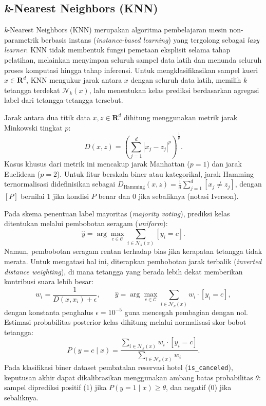 \subsection{\textit{k}-Nearest Neighbors (KNN)}

\textit{k}-Nearest Neighbors (KNN) merupakan algoritma pembelajaran mesin non-parametrik
berbasis instans (\textit{instance-based learning}) yang tergolong sebagai \textit{lazy learner}.
KNN tidak membentuk fungsi pemetaan eksplisit selama tahap pelatihan, melainkan menyimpan
seluruh sampel data latih dan menunda seluruh proses komputasi hingga tahap inferensi.
Untuk mengklasifikasikan sampel kueri $x \in \mathbf{R}^d$, KNN mengukur jarak antara $x$
dengan seluruh data latih, memilih $k$ tetangga terdekat $\mathcal{N}_k(x)$, lalu
menentukan kelas prediksi berdasarkan agregasi label dari tetangga-tetangga tersebut.

Jarak antara dua titik data $x, z \in \mathbf{R}^d$ dihitung menggunakan metrik jarak
Minkowski tingkat $p$:
\[
D(x, z) = \left( \sum_{j=1}^d |x_j - z_j|^p \right)^{\frac{1}{p}} .
\]
Kasus khusus dari metrik ini mencakup jarak Manhattan ($p=1$) dan jarak Euclidean ($p=2$).
Untuk fitur berskala biner atau kategorikal, jarak Hamming ternormalisasi didefinisikan sebagai
$D_{\text{Hamming}}(x, z) = \frac{1}{d} \sum_{j=1}^d [x_j \neq z_j]$, dengan $[P]$ bernilai 1 jika kondisi $P$ benar dan 0 jika sebaliknya (notasi Iverson).

Pada skema penentuan label mayoritas (\textit{majority voting}), prediksi kelas ditentukan
melalui pembobotan seragam (\textit{uniform}):
\[
\hat{y} = \arg\max_{c \in \mathcal{C}} \sum_{i \in \mathcal{N}_k(x)} [y_i = c] .
\]
Namun, pembobotan seragam rentan terhadap bias jika kerapatan tetangga tidak merata.
Untuk mengatasi hal ini, diterapkan pembobotan jarak terbalik (\textit{inverted distance weighting}),
di mana tetangga yang berada lebih dekat memberikan kontribusi suara lebih besar:
\[
w_i = \frac{1}{D(x, x_i) + \epsilon}, \qquad
\hat{y} = \arg\max_{c \in \mathcal{C}} \sum_{i \in \mathcal{N}_k(x)} w_i \cdot [y_i = c] ,
\]
dengan konstanta penghalus $\epsilon = 10^{-5}$ guna mencegah pembagian dengan nol.
Estimasi probabilitas posterior kelas dihitung melalui normalisasi skor bobot tetangga:
\[
P(y = c \mid x) = \frac{\sum_{i \in \mathcal{N}_k(x)} w_i \cdot [y_i = c]}{\sum_{i \in \mathcal{N}_k(x)} w_i} .
\]
Pada klasifikasi biner dataset pembatalan reservasi hotel (\texttt{is\_canceled}), keputusan akhir
dapat dikalibrasikan menggunakan ambang batas probabilitas $\theta$: sampel diprediksi positif ($1$)
jika $P(y=1 \mid x) \ge \theta$, dan negatif ($0$) jika sebaliknya.

